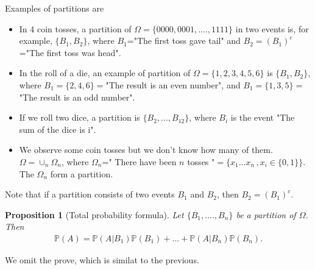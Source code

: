 \documentclass[12pt]{article}
\newtheorem{proposition}[theorem]{Proposition}
\newcommand{\<}{{\langle \!\! \langle}}
\renewcommand{\>}{{\rangle \!\! \rangle}}
\newcommand{\bel}[2]{\begin{equation} \label{#1} \begin{split} #2
 					\end{split} \end{equation}}
\begin{document}
Examples of partitions are 
\begin{itemize}
    \item In 4 coin tosses, a partition of $\Omega=\{0000,0001,....,1111\}$ in two events is, for example, $\{B_1,B_2\}$, where $B_1$="The first toss gave tail" and $B_2=(B_1)^c$="The first toss was head".
    \item In the roll of a die, an example of partition of $\Omega=\{1,2,3,4,5,6\}$ is 
    $\{B_1,B_2\}$, where $B_1=\{2,4,6\}=$"The result is an even number", and $B_1=\{1,3,5\}=$"The result is an odd number".
    \item If we roll two dice, a partition is $\{B_2,...,B_{12}\}$, where $B_i$ is the event "The sum of the dice is i".
	    	\item We observe some coin tosses but we don't know how many of them. $\Omega = \cup_n \Omega_n$, where $\Omega_n$=" There have been $n$ tosses "$=\{x_1...x_n\,,x_i\in\{0,1\}\}$. The $\Omega_n$ form a partition. 
\end{itemize}


Note that if a partition consists of two events $B_1$ and $B_2$, then $B_2=(B_1)^c$. 
\begin{proposition}[Total probability formula]
Let $\{B_1,....,B_n\}$ be a partition of $\Omega$. Then 
\bel{}{\mathbb{P}(A)=\mathbb{P}(A|B_1)\mathbb{P}(B_1)+...+\mathbb{P}(A|B_n)\mathbb{P}(B_n).}
\end{proposition}
We omit the prove, which is similat to the previous.
\end{document}
